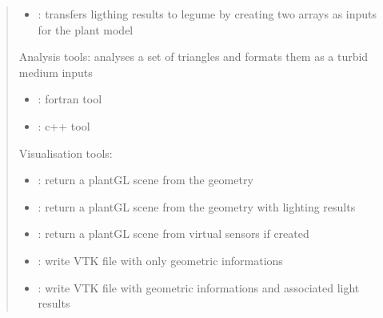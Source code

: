 \documentclass[letterpaper,10pt,english]{sphinxmanual}
\begin{document}
\begin{fulllineitems}
\begin{quote}
\begin{itemize}
\item {} 
\sphinxAtStartPar
{\hyperref[\detokenize{reference:LVM.LightVegeManager.to_l_egume}]{}}: transfers ligthing results to l\sphinxhyphen{}egume by creating two arrays as inputs for the plant model

\end{itemize}

\sphinxAtStartPar
Analysis tools: analyses a set of triangles and formats them as a turbid medium inputs
\begin{itemize}
\item {} 
\sphinxAtStartPar
{\hyperref[\detokenize{reference:LVM.LightVegeManager.s5}]{}}: fortran tool

\item {} 
\sphinxAtStartPar
{\hyperref[\detokenize{reference:LVM.LightVegeManager.s2v}]{}}: c++ tool

\end{itemize}

\sphinxAtStartPar
Visualisation tools:
\begin{itemize}
\item {} 
\sphinxAtStartPar
{\hyperref[\detokenize{reference:LVM.LightVegeManager.plantGL_nolight}]{}}: return a plantGL scene from the geometry

\item {} 
\sphinxAtStartPar
{\hyperref[\detokenize{reference:LVM.LightVegeManager.plantGL_light}]{}}: return a plantGL scene from the geometry with lighting results

\item {} 
\sphinxAtStartPar
{\hyperref[\detokenize{reference:LVM.LightVegeManager.plantGL_sensors}]{}}: return a plantGL scene from virtual sensors if created

\item {} 
\sphinxAtStartPar
{\hyperref[\detokenize{reference:LVM.LightVegeManager.VTK_nolight}]{}}: write VTK file with only geometric informations

\item {} 
\sphinxAtStartPar
{\hyperref[\detokenize{reference:LVM.LightVegeManager.VTK_light}]{}}: write VTK file with geometric informations and associated light results


\end{itemize}
\end{quote}
\end{fulllineitems}
\end{document}
